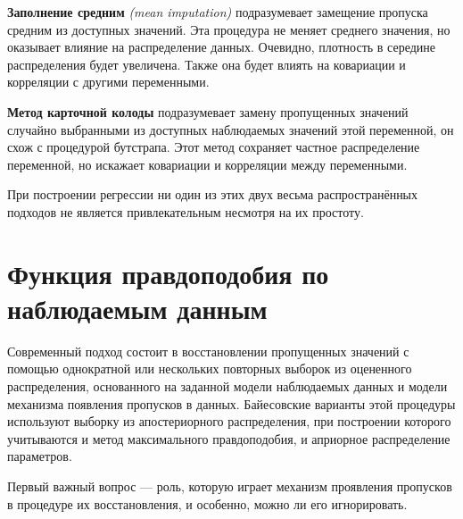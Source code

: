 {\bf Заполнение средним} \emph{(mean imputation)} подразумевает замещение пропуска средним из доступных значений. Эта процедура не меняет среднего значения, но оказывает влияние на распределение данных. Очевидно, плотность в середине распределения будет увеличена. Также она будет влиять на ковариации и корреляции с другими переменными.

{\bf Метод карточной колоды} подразумевает замену пропущенных значений случайно выбранными из доступных наблюдаемых значений этой переменной, он схож с процедурой бутстрапа. Этот метод сохраняет частное распределение переменной, но искажает ковариации и корреляции между переменными. 

При построении регрессии ни один из этих двух весьма распространённых подходов не является привлекательным несмотря на их простоту.

\section{Функция правдоподобия по наблюдаемым данным} 

Современный подход  состоит в восстановлении пропущенных значений с помощью однократной или нескольких повторных выборок из  оцененного распределения, основанного на заданной модели наблюдаемых данных и модели механизма появления пропусков в данных. Байесовские варианты этой процедуры используют выборку из апостериорного распределения, при построении которого учитываются и метод максимального правдоподобия, и априорное распределение параметров.

Первый важный вопрос --- роль, которую играет механизм проявления пропусков в процедуре их восстановления, и особенно, можно ли его игнорировать.

